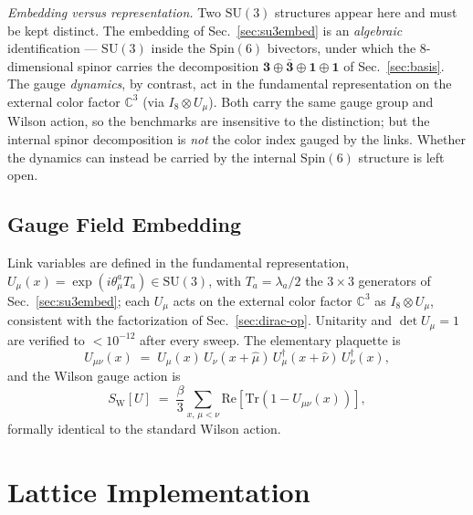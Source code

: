\documentclass[12pt]{article}
\newcommand{\spin}{\mathrm{Spin}}
\newcommand{\su}{\mathrm{SU}}
\newcommand{\tr}{\mathrm{Tr}}
\newcommand{\SW}{S_{\mathrm{W}}}       %
\begin{document}
\smallskip
\noindent\textit{Embedding versus representation.}\enspace
Two $\su(3)$ structures appear here and must be kept distinct.  The
embedding of Sec.~\ref{sec:su3embed} is an \emph{algebraic}
identification --- $\su(3)$ inside the $\spin(6)$ bivectors, under
which the 8-dimensional spinor carries the decomposition
$\mathbf{3}\oplus\bar{\mathbf{3}}\oplus\mathbf{1}\oplus\mathbf{1}$ of
Sec.~\ref{sec:basis}.  The gauge \emph{dynamics}, by contrast, act in
the fundamental representation on the external color factor
$\mathbb{C}^3$ (via $I_8\otimes U_\mu$).  Both carry the same gauge
group and Wilson action, so the benchmarks are insensitive to the
distinction; but the internal spinor decomposition is \emph{not} the
color index gauged by the links.  Whether the dynamics can instead be
carried by the internal $\spin(6)$ structure is left open.

\subsection{Gauge Field Embedding}
\label{sec:gauge-embed}

Link variables are defined in the fundamental representation,
$U_\mu(x) = \exp(i\theta_\mu^a T_a)\in\su(3)$, with $T_a=\lambda_a/2$
the $3\times3$ generators of Sec.~\ref{sec:su3embed}; each $U_\mu$
acts on the external color factor $\mathbb{C}^3$ as $I_8\otimes U_\mu$,
consistent with the factorization of Sec.~\ref{sec:dirac-op}.
Unitarity and $\det U_\mu = 1$ are verified to $<10^{-12}$ after every
sweep.  The elementary plaquette is
\begin{equation}
  U_{\mu\nu}(x) \;=\;
    U_\mu(x)\,U_\nu(x+\hat{\mu})\,U_\mu^\dagger(x+\hat{\nu})\,
    U_\nu^\dagger(x),
  \label{eq:plaquette}
\end{equation}
and the Wilson gauge action is
\begin{equation}
  \SW[U] \;=\; \frac{\beta}{3}\sum_{x,\,\mu<\nu}
    \mathrm{Re}\!\left[\tr\!\left(1 - U_{\mu\nu}(x)\right)\right],
  \label{eq:wilson-action}
\end{equation}
formally identical to the standard Wilson action.

\section{Lattice Implementation}
\label{sec:implementation}
\end{document}
